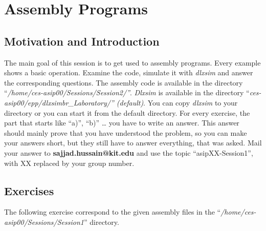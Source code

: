 \hypertarget{assembly-programs}{%
\chapter*{Assembly Programs}\label{assembly-programs}}


\section*{Motivation and Introduction}

The main goal of this session is to get used to assembly programs. Every
example shows a basic operation. Examine the code, simulate it with
\emph{dlxsim} and answer the corresponding questions. The assembly code
is available in the directory
``\emph{/home/ces-asip00/Sessions/Session2/''}. \emph{Dlxsim} is available
in the directory
``\emph{ces-asip00/}\emph{epp/dlxsimbr\_}\emph{Laboratory/'' (default)}. You
can copy \emph{dlxsim} to your directory or you can start it from the
default directory. For every exercise, the part that starts like ``a)'',
``b)'' \ldots{} you have to write an answer. This answer should mainly
prove that you have understood the problem, so you can make your answers
short, but they still have to answer everything, that was asked. Mail
your answer to \textbf{sajjad.hussain@kit.edu} and use the topic
``asipXX-Session1'', with XX replaced by your group number.

\section*{Exercises}

The following exercise correspond to the given assembly files in the
``\emph{/home/ces-asip00/Sessions/Session1}'' directory.

